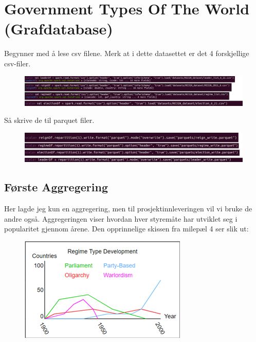\section{Government Types Of The World (Grafdatabase)}

Begynner med å lese csv filene. Merk at i dette datasettet er det 4 forskjellige csv-filer.

\FigureCounter
\begin{figure}[H]
    \includegraphics[width=\textwidth]{images/milepael5/graphDbImport.png}
\end{figure}

Så skrive de til parquet filer.

\FigureCounter
\begin{figure}[H]
    \includegraphics[width=\textwidth]{images/milepael5/writeGraphDb.png}
\end{figure}

\subsection{Første Aggregering}
Her lagde jeg kun en aggregering, men til prosjektinnleveringen vil vi bruke de andre også. Aggregeringen viser hvordan hver styremåte har utviklet seg i popularitet gjennom årene. Den opprinnelige skissen fra milepæl 4 ser slik ut:

\FigureCounter
\begin{figure}[H]
    \includegraphics[width=\textwidth]{images/milepael5/regimeTypeGraphic.png}
\end{figure}

